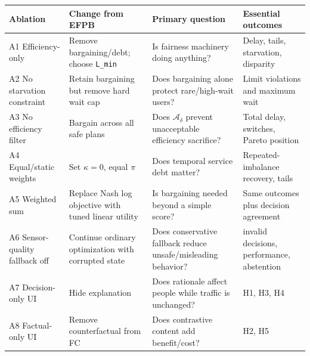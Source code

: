 \documentclass[
  english,
  11pt,
  a4paper,
]{article}
\newcounter{none} %
\begin{document}
{\def\LTcaptype{none} %
\begin{longtable}[]{@{}
  >{\raggedright\arraybackslash}p{}
  >{\raggedright\arraybackslash}p{}
  >{\raggedright\arraybackslash}p{}
  >{\raggedright\arraybackslash}p{}@{}}
\toprule\noalign{}
\begin{minipage}[b]{\linewidth}\raggedright
Ablation
\end{minipage} & \begin{minipage}[b]{\linewidth}\raggedright
Change from EFPB
\end{minipage} & \begin{minipage}[b]{\linewidth}\raggedright
Primary question
\end{minipage} & \begin{minipage}[b]{\linewidth}\raggedright
Essential outcomes
\end{minipage} \\
\midrule\noalign{}
\endhead
\bottomrule\noalign{}
\endlastfoot
A1 Efficiency-only & Remove bargaining/debt; choose \texttt{L\_min} & Is
fairness machinery doing anything? & Delay, tails, starvation,
disparity \\
A2 No starvation constraint & Retain bargaining but remove hard wait cap
& Does bargaining alone protect rare/high-wait users? & Limit violations
and maximum wait \\
A3 No efficiency filter & Bargain across all safe plans & Does
\(\mathcal{A}_\delta\)
prevent unacceptable efficiency sacrifice? & Total delay, switches,
Pareto position \\
A4 Equal/static weights & Set \(\kappa=0\), equal \(\pi{}\) & Does temporal
service debt matter? & Repeated-imbalance recovery, tails \\
A5 Weighted sum & Replace Nash log objective with tuned linear utility &
Is bargaining needed beyond a simple score? & Same outcomes plus
decision agreement \\
A6 Sensor-quality fallback off & Continue ordinary optimization with
corrupted state & Does conservative fallback reduce unsafe/misleading
behavior? & invalid decisions, performance, abstention \\
A7 Decision-only UI & Hide explanation & Does rationale affect people
while traffic is unchanged? & H1, H3, H4 \\
A8 Factual-only UI & Remove counterfactual from FC & Does contrastive
content add benefit/cost? & H2, H5 \\
\end{longtable}
}
\end{document}
